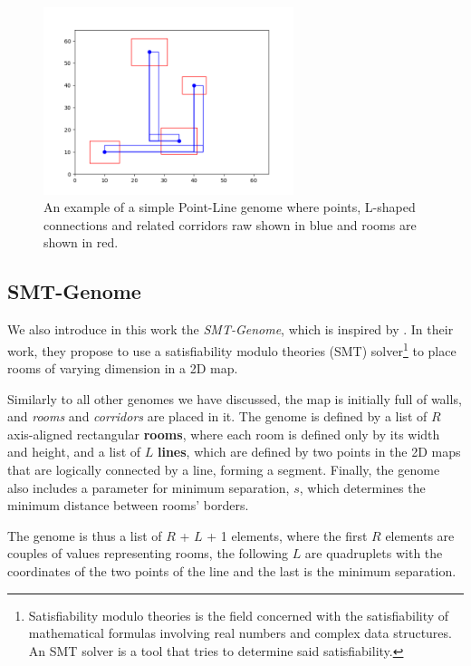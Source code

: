\begin{figure}[hbt!]
    \centering
    \includegraphics[width=0.65\textwidth]{images/PointGenome.png}
    \caption[Point-Line example]{An example of a simple Point-Line genome where points, L-shaped connections and related corridors raw shown in blue and rooms are shown in red.}
    \label{fig:point_line}
\end{figure}

\subsection{SMT-Genome}
\label{subsec:smt_genome}

We also introduce in this work the \textit{SMT-Genome}, which is inspired by \citet{whitehead_spatial_2020}. In their work, they propose to use a satisfiability modulo theories (SMT) solver\footnote{Satisfiability modulo theories is the field concerned with the satisfiability of mathematical formulas involving real numbers and complex data structures. An SMT solver is a tool that tries to determine said satisfiability.} to place rooms of varying dimension in a 2D map. 

Similarly to all other genomes we have discussed, the map is initially full of walls, and \textit{rooms} and \textit{corridors} are placed in it.
The genome is defined by a list of $R$ axis-aligned rectangular \textbf{rooms}, where each room is defined only by its width and height, and a list of $L$ \textbf{lines}, which are defined by two points in the 2D maps that are logically connected by a line, forming a segment. Finally, the genome also includes a parameter for minimum separation, $s$, which determines the minimum distance between rooms' borders. 

The genome is thus a list of $R$ + $L$ + 1 elements, where the first $R$ elements are couples of values representing rooms, the following $L$ are quadruplets with the coordinates of the two points of the line and the last is the minimum separation.

